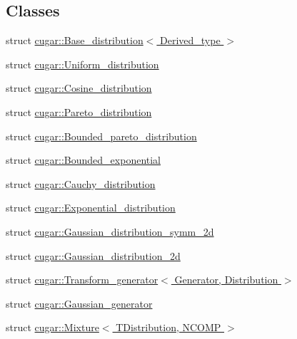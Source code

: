 \subsection*{Classes}
\begin{DoxyCompactItemize}
\item 
struct \hyperlink{structcugar_1_1_base__distribution}{cugar\+::\+Base\+\_\+distribution$<$ Derived\+\_\+type $>$}
\item 
struct \hyperlink{structcugar_1_1_uniform__distribution}{cugar\+::\+Uniform\+\_\+distribution}
\item 
struct \hyperlink{structcugar_1_1_cosine__distribution}{cugar\+::\+Cosine\+\_\+distribution}
\item 
struct \hyperlink{structcugar_1_1_pareto__distribution}{cugar\+::\+Pareto\+\_\+distribution}
\item 
struct \hyperlink{structcugar_1_1_bounded__pareto__distribution}{cugar\+::\+Bounded\+\_\+pareto\+\_\+distribution}
\item 
struct \hyperlink{structcugar_1_1_bounded__exponential}{cugar\+::\+Bounded\+\_\+exponential}
\item 
struct \hyperlink{structcugar_1_1_cauchy__distribution}{cugar\+::\+Cauchy\+\_\+distribution}
\item 
struct \hyperlink{structcugar_1_1_exponential__distribution}{cugar\+::\+Exponential\+\_\+distribution}
\item 
struct \hyperlink{structcugar_1_1_gaussian__distribution__symm__2d}{cugar\+::\+Gaussian\+\_\+distribution\+\_\+symm\+\_\+2d}
\item 
struct \hyperlink{structcugar_1_1_gaussian__distribution__2d}{cugar\+::\+Gaussian\+\_\+distribution\+\_\+2d}
\item 
struct \hyperlink{structcugar_1_1_transform__generator}{cugar\+::\+Transform\+\_\+generator$<$ Generator, Distribution $>$}
\item 
struct \hyperlink{structcugar_1_1_gaussian__generator}{cugar\+::\+Gaussian\+\_\+generator}
\item 
struct \hyperlink{structcugar_1_1_mixture}{cugar\+::\+Mixture$<$ T\+Distribution, N\+C\+O\+M\+P $>$}
\end{DoxyCompactItemize}

